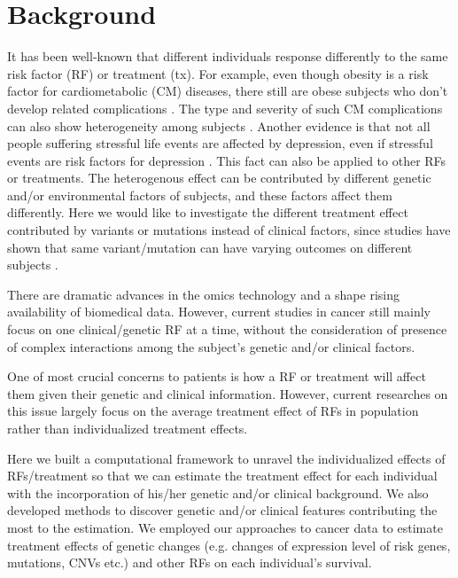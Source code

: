 \section{Background}
\label{sec:ite_bg}
  It has been well-known that different individuals response differently to the same risk factor (RF) or treatment (tx). For example, even though obesity is a risk factor for cardiometabolic (CM) diseases, there still are obese subjects who don't develop related complications \cite{neeland2018cardiovascular}. The type and severity of such CM complications can also show heterogeneity among subjects \cite{neeland2018cardiovascular}. Another evidence is that not all people suffering stressful life events are affected by depression, even if stressful events are risk factors for depression \cite{yang2015effects}. This fact can also be applied to other RFs or treatments. The heterogenous effect can be contributed by different genetic and/or environmental factors of subjects, and these factors affect them differently. Here we would like to investigate the different treatment effect contributed by variants or mutations instead of clinical factors, since studies have shown that same variant/mutation can have varying outcomes on different subjects \cite{aggarwal2018influence, o2018cystic,vanderlaan2017mutations}.

  There are dramatic advances in the omics technology and a shape rising availability of biomedical data. However, current studies in cancer still mainly focus on one clinical/genetic RF at a time, without the consideration of presence of complex interactions among the subject's genetic and/or clinical factors. 
  
  One of most crucial concerns to patients is how a RF or treatment will affect them given their genetic and clinical information. However, current researches on this issue largely focus on the average treatment effect of RFs in population rather than individualized treatment effects.

  Here we built a computational framework to unravel the individualized effects of RFs/treatment so that we can estimate the treatment effect for each individual with the incorporation of his/her genetic and/or clinical background. We also developed methods to discover genetic and/or clinical features contributing the most to the estimation. We employed our approaches to cancer data to estimate treatment effects of genetic changes (e.g. changes of expression level of risk genes, mutations, CNVs etc.) and other RFs on each individual's survival.

